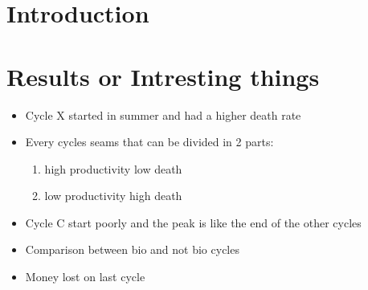 \documentclass[11pt]{article}
\begin{document}
\section{Introduction}

\section{Results or Intresting things}
\begin{itemize}
    \item Cycle X started in summer and had a higher death rate
    \item Every cycles seams that can be divided in 2 parts:
    \begin{enumerate}
        \item high productivity low death
        \item low productivity high death
    \end{enumerate}
    \item Cycle C start poorly and the peak is like the end of the other cycles
    \item Comparison between bio and not bio cycles
    \item Money lost on last cycle
\end{itemize}
\end{document}
